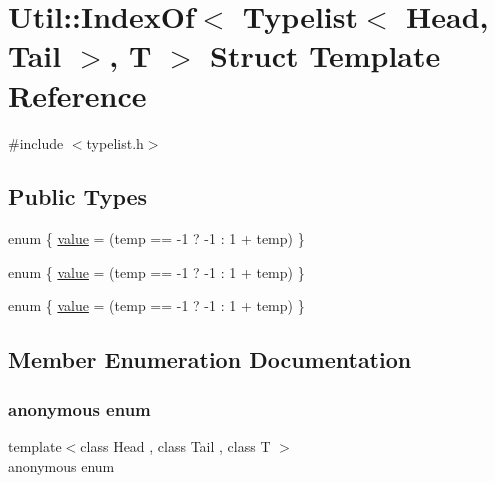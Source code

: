 \hypertarget{structUtil_1_1TL_1_1IndexOf_3_01Typelist_3_01Head_00_01Tail_01_4_00_01T_01_4}{}\section{Util\+:\+:Index\+Of$<$ Typelist$<$ Head, Tail $>$, T $>$ Struct Template Reference}
\label{structUtil_1_1TL_1_1IndexOf_3_01Typelist_3_01Head_00_01Tail_01_4_00_01T_01_4}


{\ttfamily \#include $<$typelist.\+h$>$}

\subsection*{Public Types}
\begin{DoxyCompactItemize}
\item 
enum \{ \mbox{\hyperlink{structUtil_1_1TL_1_1IndexOf_3_01Typelist_3_01Head_00_01Tail_01_4_00_01T_01_4_a892f6adeff170978902bc573ce2ed8c6a1e7a87771ff8eabd5b26f13ca2c1852b}{value}} = (temp == -\/1 ? -\/1 \+: 1 + temp)
 \}
\item 
enum \{ \mbox{\hyperlink{structUtil_1_1TL_1_1IndexOf_3_01Typelist_3_01Head_00_01Tail_01_4_00_01T_01_4_a892f6adeff170978902bc573ce2ed8c6a1e7a87771ff8eabd5b26f13ca2c1852b}{value}} = (temp == -\/1 ? -\/1 \+: 1 + temp)
 \}
\item 
enum \{ \mbox{\hyperlink{structUtil_1_1TL_1_1IndexOf_3_01Typelist_3_01Head_00_01Tail_01_4_00_01T_01_4_a892f6adeff170978902bc573ce2ed8c6a1e7a87771ff8eabd5b26f13ca2c1852b}{value}} = (temp == -\/1 ? -\/1 \+: 1 + temp)
 \}
\end{DoxyCompactItemize}


\subsection{Member Enumeration Documentation}
\mbox{\label{structUtil_1_1TL_1_1IndexOf_3_01Typelist_3_01Head_00_01Tail_01_4_00_01T_01_4_adb54f5ccfd004deb6c49f36f07ab8dd9}} 
\subsubsection{\texorpdfstring{anonymous enum}{anonymous enum}}
{\footnotesize\ttfamily template$<$class Head , class Tail , class T $>$ \\
anonymous enum}

